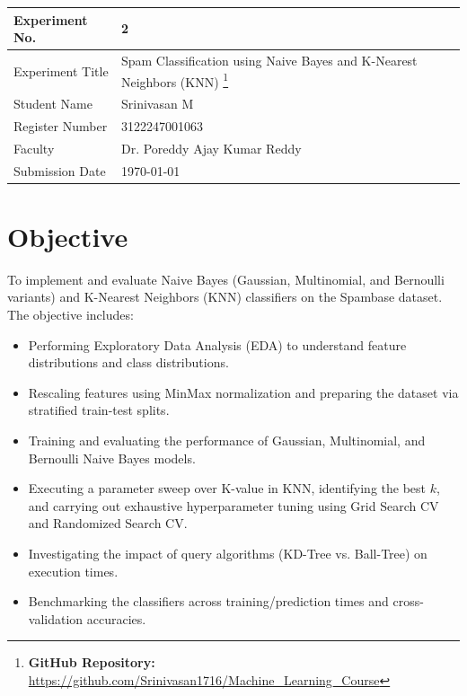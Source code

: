 \documentclass[12pt,a4paper]{article}
\begin{document}
\begin{tabular}{|p{4cm}|p{11cm}|}
\hline
Experiment No. & 2 \\ \hline
Experiment Title & Spam Classification using Naive Bayes and K-Nearest Neighbors (KNN)
\footnote{\textbf{GitHub Repository: }\url{https://github.com/Srinivasan1716/Machine_Learning_Course}}\\ \hline
Student Name & Srinivasan M \\ \hline
Register Number & 3122247001063 \\ \hline
Faculty & Dr. Poreddy Ajay Kumar Reddy \\ \hline
Submission Date & \today \\ \hline
\end{tabular}

\section{Objective}
To implement and evaluate Naive Bayes (Gaussian, Multinomial, and Bernoulli variants) and K-Nearest Neighbors (KNN) classifiers on the Spambase dataset. The objective includes:
\begin{itemize}
    \item Performing Exploratory Data Analysis (EDA) to understand feature distributions and class distributions.
    \item Rescaling features using MinMax normalization and preparing the dataset via stratified train-test splits.
    \item Training and evaluating the performance of Gaussian, Multinomial, and Bernoulli Naive Bayes models.
    \item Executing a parameter sweep over K-value in KNN, identifying the best $k$, and carrying out exhaustive hyperparameter tuning using Grid Search CV and Randomized Search CV.
    \item Investigating the impact of query algorithms (KD-Tree vs. Ball-Tree) on execution times.
    \item Benchmarking the classifiers across training/prediction times and cross-validation accuracies.
\end{itemize}
\end{document}
